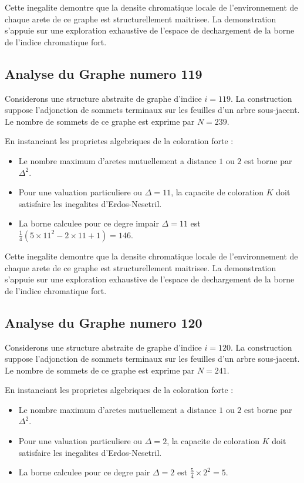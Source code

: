\documentclass[11pt,a4paper]{article}
\begin{document}
Cette inegalite demontre que la densite chromatique locale de l'environnement de chaque arete de ce graphe est structurellement maitrisee. La demonstration s'appuie sur une exploration exhaustive de l'espace de dechargement de la borne de l'indice chromatique fort.

\subsection{Analyse du Graphe numero 119}
Considerons une structure abstraite de graphe d'indice $i = 119$. La construction suppose l'adjonction de sommets terminaux sur les feuilles d'un arbre sous-jacent. Le nombre de sommets de ce graphe est exprime par $N = 239$.

En instanciant les proprietes algebriques de la coloration forte :
\begin{itemize}
\item Le nombre maximum d'aretes mutuellement a distance $1$ ou $2$ est borne par $\Delta^2$.
\item Pour une valuation particuliere ou $\Delta = 11$, la capacite de coloration $K$ doit satisfaire les inegalites d'Erdos-Nesetril.
\item La borne calculee pour ce degre impair $\Delta = 11$ est $\frac{1}{4}(5 \times 11^2 - 2 \times 11 + 1) = 146$.
\end{itemize}

Cette inegalite demontre que la densite chromatique locale de l'environnement de chaque arete de ce graphe est structurellement maitrisee. La demonstration s'appuie sur une exploration exhaustive de l'espace de dechargement de la borne de l'indice chromatique fort.

\subsection{Analyse du Graphe numero 120}
Considerons une structure abstraite de graphe d'indice $i = 120$. La construction suppose l'adjonction de sommets terminaux sur les feuilles d'un arbre sous-jacent. Le nombre de sommets de ce graphe est exprime par $N = 241$.

En instanciant les proprietes algebriques de la coloration forte :
\begin{itemize}
\item Le nombre maximum d'aretes mutuellement a distance $1$ ou $2$ est borne par $\Delta^2$.
\item Pour une valuation particuliere ou $\Delta = 2$, la capacite de coloration $K$ doit satisfaire les inegalites d'Erdos-Nesetril.
\item La borne calculee pour ce degre pair $\Delta = 2$ est $\frac{5}{4} \times 2^2 = 5$.
\end{itemize}
\end{document}
